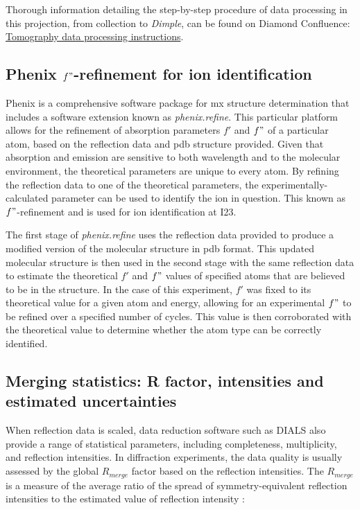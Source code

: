 Thorough information detailing the step-by-step procedure of data processing in this projection, from collection to \textit{Dimple}, can be found on Diamond Confluence: \href{https://confluence.diamond.ac.uk/x/yIWuD}{Tomography data processing instructions}. %

\subsection{Phenix $f"$-refinement for ion identification}

Phenix is a comprehensive software package for \ac{mx} structure determination that includes a software extension known as \textit{phenix.refine}. This particular platform allows for the refinement of absorption parameters $f'$ and $f"$ of a particular atom, based on the reflection data and \ac{pdb} structure provided. Given that absorption and emission are sensitive to both wavelength and to the molecular environment, the theoretical parameters are unique to every atom. By refining the reflection data to one of the theoretical parameters, the experimentally-calculated parameter can be used to identify the ion in question. This known as $f"$-refinement and is used for ion identification at I23.

The first stage of \textit{phenix.refine} uses the reflection data provided to produce a modified version of the molecular structure in \ac{pdb} format. This updated molecular structure is then used in the second stage with the same reflection data to estimate the theoretical $f'$ and $f"$ values of specified atoms that are believed to be in the structure. In the case of this experiment, $f'$ was fixed to its theoretical value for a given atom and energy, allowing for an experimental $f"$ to be refined over a specified number of cycles. This value is then corroborated with the theoretical value to determine whether the atom type can be correctly identified.%

\subsection{Merging statistics: R factor, intensities and estimated uncertainties}

When reflection data is scaled, data reduction software such as DIALS also provide a range of statistical parameters, including completeness, multiplicity, and reflection intensities. In diffraction experiments, the data quality is usually assessed by the global $R_{merge}$ factor based on the reflection intensities. The $R_{merge}$ is a measure of the average ratio of the spread of symmetry-equivalent reflection intensities to the estimated value of reflection intensity \cite{Dauter1999}:

